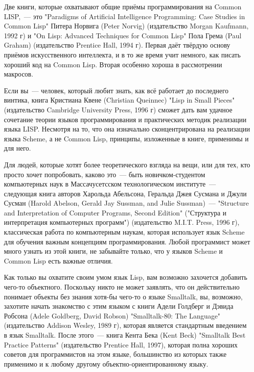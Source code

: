 Две книги, которые охватывают общие приёмы программирования на Common LISP,~--- это
"Paradigms of Artificial Intelligence Programming: Case Studies in Common Lisp" Питера
Норвига (Peter Norvig) (издательство Morgan Kaufmann, 1992 г) и "On Lisp: Advanced
Techniques for Common Lisp" Пола Грема (Paul Graham) (издательство Prentice Hall, 1994
г). Первая даёт твёрдую основу приёмов искусственного интеллекта, и в то же время учит
немного, как писать хороший код на Common Lisp. Вторая особенно хороша в рассмотрении
макросов.

Если вы~--- человек, который любит знать, как всё работает до последнего винтика, книга
Кристиана Квене (Christian Queinnec) "Lisp in Small Pieces" (издательство Cambridge
University Press, 1996 г) сможет дать вам удачное сочетание теории языков программирования
и практических методик реализации языка LISP. Несмотря на то, что она изначально
сконцентрирована на реализации языка Scheme, а не Common Lisp, принципы, изложенные в
книге, применимы и для него.

Для людей, которые хотят более теоретического взгляда на вещи, или для тех, кто просто
хочет попробовать, каково это~--- быть новичком-студентом компьютерных наук в
Массачусетсском технологическом институте~--- следующая книга авторов Харольда Абельсона,
Геральда Джея Сусмана и Джули Сусман (Harold Abelson, Gerald Jay Sussman, and Julie
Sussman)~--- "Structure and Interpretation of Computer Programs, Second Edition"
("Структура и интерпретация компьютерных программ") (издательство M.I.T. Press, 1996 г),
классическая работа по компьютерным наукам, которая использует язык Scheme для обучения
важным концепциям программирования. Любой программист может много узнать из этой книги, не
забывайте только, что у языков Scheme и Common Lisp есть важные отличия.

Как только вы охватите своим умом язык Lisp, вам возможно захочется добавить чего-то
объектного. Поскольку никто не может заявлять, что он действительно понимает объекты без
знания хотя-бы чего-то о языке Smalltalk, вы, возможно, захотите начать знакомство с этим
языком с книги Адели Голдберг и Дэвида Робсона (Adele Goldberg, David Robson)
"Smalltalk-80: The Language" (издательство Addison Wesley, 1989 г), которая является
стандартным введением в язык Smalltalk. После этого~--- книга Кента Бека (Kent Beck)
"Smalltalk Best Practice Patterns" (издательство Prentice Hall, 1997), которая полна
хороших советов для программистов на этом языке, большинство из которых также применимо и
к любому другому объектно-ориентированному языку.


